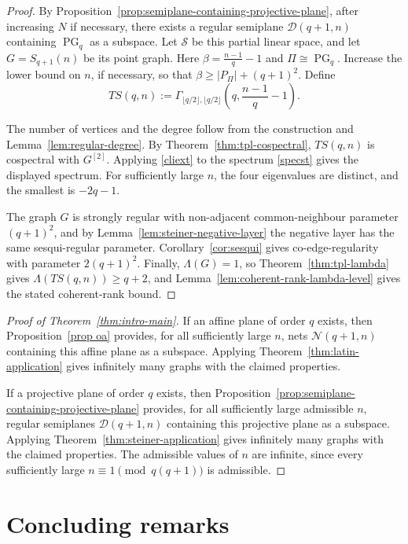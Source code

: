 \documentclass[reqno,a4paper,11pt]{article}
\theoremstyle{definition}
\theoremstyle{remark}
\newcommand{\PG}{\operatorname{PG}}
\begin{document}
\begin{proof}
By Proposition~\ref{prop:semiplane-containing-projective-plane}, after
increasing \(N\) if necessary, there exists a regular semiplane
\(\mathcal D(q+1,n)\) containing \(\PG_q\) as a subspace.  Let
\(\mathcal S\) be this partial linear space, and let \(G=S_{q+1}(n)\)
be its point graph.
Here
$\beta=\frac{n-1}{q}-1$ and $
\Pi\cong\PG_q.$
Increase the lower bound on $n$, if necessary, so that
$\beta\ge |P_\Pi|+(q+1)^2.$
Define
\[
TS(q,n):=\Gamma_{\lfloor q/2\rfloor,\lfloor q/2\rfloor}\left(q,\frac{n-1}{q}-1\right).
\]

The number of vertices and the degree follow from the construction and Lemma~\ref{lem:regular-degree}.
By Theorem~\ref{thm:tpl-cospectral}, $TS(q,n)$ is cospectral with $G^{[2]}$.
Applying \eqref{cliext} to the spectrum \eqref{specst} gives the displayed spectrum.
For sufficiently large $n$, the four eigenvalues are distinct, and the smallest is $-2q-1$.

The graph $G$ is strongly regular with non-adjacent common-neighbour parameter $(q+1)^2$, and by Lemma~\ref{lem:steiner-negative-layer} the negative layer has the same sesqui-regular parameter.
Corollary~\ref{cor:sesqui} gives co-edge-regularity with parameter $2(q+1)^2$.
Finally, $\Lambda(G)=1$, so Theorem~\ref{thm:tpl-lambda} gives $\Lambda(TS(q,n))\ge q+2$, and Lemma~\ref{lem:coherent-rank-lambda-level} gives the stated coherent-rank bound.
\end{proof}

\begin{proof}[Proof of Theorem~\ref{thm:intro-main}]
	If an affine plane of order \(q\) exists, then Proposition~\ref{prop oa}
	provides, for all sufficiently large \(n\), nets \(\mathcal N(q+1,n)\)
	containing this affine plane as a subspace. Applying
	Theorem~\ref{thm:latin-application} gives infinitely many graphs with the
	claimed properties.
	
	If a projective plane of order \(q\) exists, then
	Proposition~\ref{prop:semiplane-containing-projective-plane} provides, for
	all sufficiently large admissible \(n\), regular semiplanes
	\(\mathcal D(q+1,n)\) containing this projective plane as a subspace.
	Applying Theorem~\ref{thm:steiner-application} gives infinitely many graphs
	with the claimed properties. The admissible values of \(n\) are infinite,
	since every sufficiently large \(n\equiv1\pmod{q(q+1)}\) is admissible.
\end{proof}

\section{Concluding remarks}\label{sec:conclusion}
\end{document}
